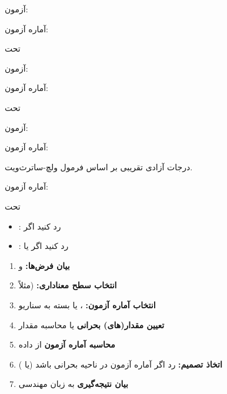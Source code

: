 آزمون: 

آماره آزمون: 

تحت 


آزمون: 

آماره آزمون: 

تحت 


آزمون: 

آماره آزمون: 

درجات آزادی تقریبی بر اساس فرمول ولچ-ساترث‌ویت.




آماره آزمون: 

تحت 


\begin{itemize}
\tightlist
\item
  : رد کنید اگر 
\item
  : رد کنید اگر  یا 
\end{itemize}


\begin{enumerate}
\def\labelenumi{\arabic{enumi}.}
\tightlist
\item
  \textbf{بیان فرض‌ها:}  و 
\item
  \textbf{انتخاب سطح معناداری:} \lr{$\alpha$} (مثلاً 
\item
  \textbf{انتخاب آماره آزمون:} ،  یا  بسته به سناریو
\item
  \textbf{تعیین مقدار(های) بحرانی} یا محاسبه مقدار 
\item
  \textbf{محاسبه آماره آزمون} از داده
\item
  \textbf{اتخاذ تصمیم:} رد  اگر آماره آزمون در ناحیه بحرانی باشد (یا )
\item
  \textbf{بیان نتیجه‌گیری} به زبان مهندسی
\end{enumerate}

